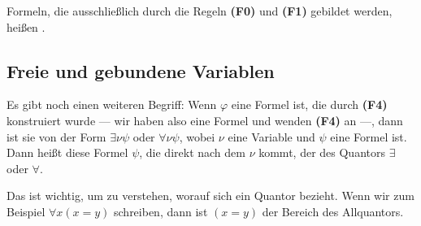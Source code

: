 \begin{math-stroke}

\begin{remark}
Formeln, die ausschließlich durch die Regeln \textbf{(F0)} und \textbf{(F1)} gebildet werden, heißen .
\end{remark}
\end{math-stroke}

\begin{ai-global-state-checkpoint-invisible-content}
\end{ai-global-state-checkpoint-invisible-content}

\subsection{Freie und gebundene Variablen}

\begin{spoken-clean}[01:02:57 - 01:05:27]
Es gibt noch einen weiteren Begriff: Wenn $\varphi$ eine Formel ist, die durch \textbf{(F4)} konstruiert wurde --- wir haben also eine Formel und wenden \textbf{(F4)} an ---, dann ist sie von der Form $\exists\nu\psi$ oder $\forall\nu\psi$, wobei $\nu$ eine Variable und $\psi$ eine Formel ist. Dann heißt diese Formel $\psi$, die direkt nach dem $\nu$ kommt, der  des Quantors $\exists$ oder $\forall$. 

Das ist wichtig, um zu verstehen, worauf sich ein Quantor bezieht. Wenn wir zum Beispiel $\forall x (x = y)$ schreiben, dann ist $(x = y)$ der Bereich des Allquantors.
\end{spoken-clean}

